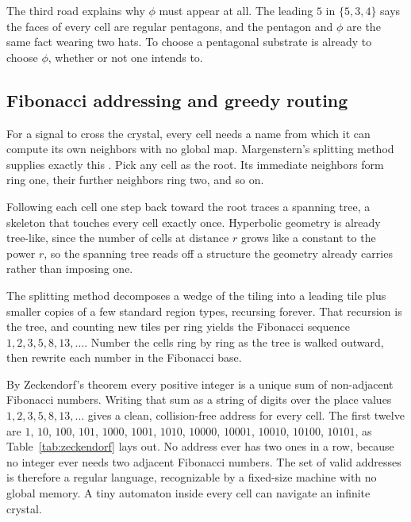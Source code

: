 The third road explains why $\phi$ must appear at all. The leading $5$ in $\{5,3,4\}$ says the
faces of every cell are regular pentagons, and the pentagon and $\phi$ are the same fact wearing two hats. To
choose a pentagonal substrate is already to choose $\phi$, whether or not one intends to.

\subsection{Fibonacci addressing and greedy routing}

For a signal to cross the crystal, every cell needs a name from which it can compute its own neighbors with
no global map. Margenstern's splitting method supplies exactly this \cite{margenstern2013}. Pick any cell as
the root. Its immediate neighbors form ring one, their further neighbors ring two, and so on.

Following each
cell one step back toward the root traces a spanning tree, a skeleton that touches every cell exactly once.
Hyperbolic geometry is already tree-like, since the number of cells at distance $r$ grows like a constant to
the power $r$, so the spanning tree reads off a structure the geometry already carries rather than imposing
one.

The splitting method decomposes a wedge of the tiling into a leading tile plus smaller copies of a few
standard region types, recursing forever. That recursion is the tree, and counting new tiles per ring yields
the Fibonacci sequence $1, 2, 3, 5, 8, 13, \dots$. Number the cells ring by ring as the tree is walked
outward, then rewrite each number in the Fibonacci base.

By Zeckendorf's theorem every positive integer is a
unique sum of non-adjacent Fibonacci numbers. Writing that sum as a string of digits over the place values
$1, 2, 3, 5, 8, 13, \dots$ gives a clean, collision-free address for every cell. The first twelve are $1$,
$10$, $100$, $101$, $1000$, $1001$, $1010$, $10000$, $10001$, $10010$, $10100$, $10101$, as Table~\ref{tab:zeckendorf}
lays out. No address ever has
two ones in a row, because no integer ever needs two adjacent Fibonacci numbers. The set of valid addresses
is therefore a regular language, recognizable by a fixed-size machine with no global memory. A tiny automaton
inside every cell can navigate an infinite crystal.

